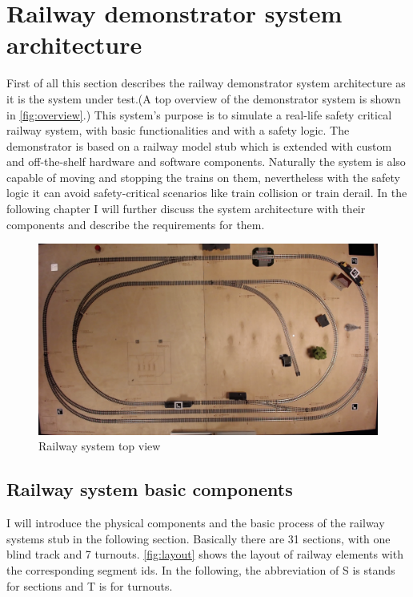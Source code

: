 \chapter{Railway demonstrator system architecture}\label{chapter:RailwaySystem}
First of all this section describes the railway demonstrator system architecture as it is the system under test.(A top overview of the demonstrator system is shown in \autoref{fig:overview}.) This system's purpose is to simulate a real-life safety critical railway system, with basic functionalities and with a safety logic. The demonstrator is based on a railway model stub which is extended with custom and off-the-shelf hardware and software components. Naturally the system is also capable of moving and stopping the trains on them, nevertheless with the safety logic it can avoid safety-critical scenarios like train collision or train derail. In the following chapter I will further discuss the system architecture with their components and describe the requirements for them.
\begin{figure}[ht]
	\centering
	\includegraphics[width=150mm, keepaspectratio, angle = 180]{figures/modes3/overview.jpg}
	\caption{Railway system top view}
	\label{fig:overview}
\end{figure}

\section{Railway system basic components}
I will introduce the physical components and the basic process of the railway systems stub in the following section. Basically there are 31 sections, with one blind track and 7 turnouts. \autoref{fig:layout} shows the layout of railway elements with the corresponding segment ids. In the following, the abbreviation of S is stands for sections and T is for turnouts.


